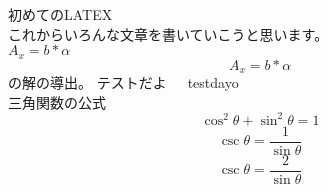 \documentclass[10pt]{bxjsarticle}
\begin{document}
初めてのLATEX\\
これからいろんな文章を書いていこうと思います。\\
$A_x=b*\alpha$
\begin{equation}
A_x=b*\alpha
\end{equation}
の解の導出。
テストだよ\ \ \ testdayo\\
三角関数の公式
\begin{equation}
\cos^2 \theta+\sin^2 \theta=1
\end{equation}
\begin{equation}
\csc \theta = \frac{1}{\sin \theta}
\end{equation}
\begin{equation}
\csc \theta = \frac{2}{\sin \theta}
\end{equation}
\end{document}
